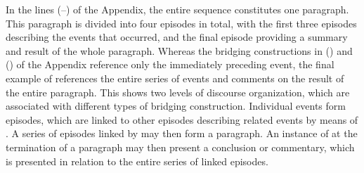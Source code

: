 \documentclass[output=paper]{LSP/langsci}
\begin{document}
	In the lines (--) of the Appendix, the entire sequence constitutes one paragraph. This paragraph is divided into four episodes in total, with the first three episodes describing the events that occurred, and the final episode providing a summary and result of the whole paragraph. Whereas the bridging constructions in () and () of the Appendix reference only the immediately preceding event, the final example of  references the entire series of events and comments on the result of the entire paragraph. This shows two levels of discourse organization, which are associated with different types of bridging construction. Individual events form episodes, which are linked to other episodes describing related events by means of . A series of episodes linked by  may then form a paragraph. An instance of  at the termination of a paragraph may then present a conclusion or commentary, which is presented in relation to the entire series of linked episodes.
	
\end{document}
